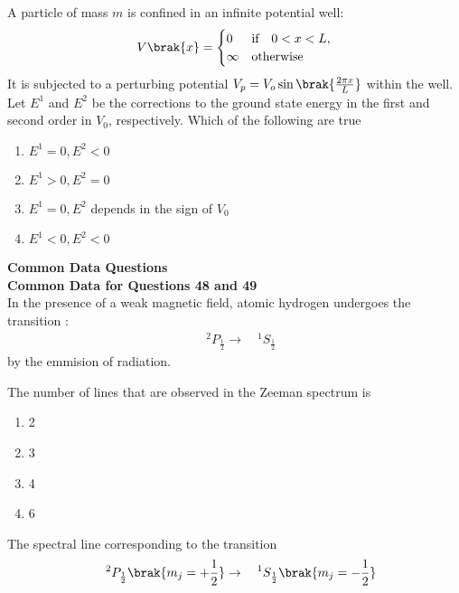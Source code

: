         \item[47.] A particle of mass $m$ is confined in an infinite potential well:
            \begin{align}
                V\brak{x} =  \begin{cases}
                    0 & \textnormal{if}  \quad 0 < x < L,\\
                    \infty & \textnormal{otherwise}
                \end{cases}
            \end{align}
            It is subjected to a perturbing potential $V_p = V_o \sin \brak{\frac{2\pi x}{L}}$
            within the well. Let $E^1$ and $E^2$ be the corrections to the ground state energy in the 
            first and second order in $V_0$, respectively. Which of the following are true
            \hfill{}
            \begin{enumerate}
                \item $E^1 = 0, E^2 < 0$
                \item $E^1>0, E^2 = 0$
                \item $E^1 = 0, E^2$ depends in the sign of $V_0$
                \item $E^1 < 0, E^2 < 0$
            \end{enumerate}
            \textbf{Common Data Questions}\\
            \textbf{Common Data for Questions 48 and 49}\\
            In the presence of a weak magnetic field, atomic hydrogen undergoes the transition :
            \begin{align}
                {\quad}^2 P_{\frac{1}{2}} \rightarrow {\quad}^1 S_{\frac{1}{2}}
            \end{align}
            by the emmision of radiation.
        \item[48.] The number of lines that are observed in the Zeeman spectrum is
            \hfill{}
            \begin{enumerate}
                \item 2
                \item 3
                \item 4
                \item 6
            \end{enumerate}
        \item[49.] The spectral line corresponding to the transition 
            \begin{align}
                {\quad}^2 P_{\frac{1}{2}}\brak{m_j = + \frac{1}{2}} \rightarrow {\quad}^1 S_{\frac{1}{2}}\brak{m_j = -\frac{1}{2}}
            \end{align}
